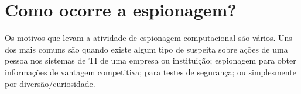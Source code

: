 \section{Como ocorre a espionagem? \label{sec:como-ocorre}}

Os motivos que levam a atividade de espionagem computacional são vários. Uns dos mais comuns são quando existe algum tipo de suspeita sobre ações de uma pessoa nos sistemas de TI de uma empresa ou instituição; espionagem para obter informações de vantagem competitiva; para testes de segurança; ou simplesmente por diversão/curiosidade.
